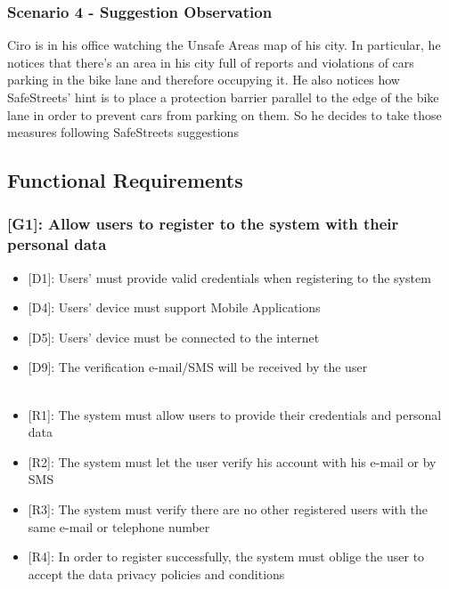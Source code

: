 \documentclass[12pt,a4paper]{article}
\begin{document}
\subsubsection*{Scenario 4 - Suggestion Observation}
Ciro is in his office watching the Unsafe Areas map of his city. In particular, he notices that there's an area in his city full of reports and violations of cars parking in the bike lane and therefore occupying it. He also notices how SafeStreets' hint is to place a protection barrier parallel to the edge of the bike lane in order to prevent cars from parking on them. So he decides to take those measures following SafeStreets suggestions
\newpage
\subsection{Functional Requirements}
\subsubsection*{{[}{G1}{]}: Allow users to register to the system with their personal data}
\begin{itemize}
\item {[D1]}: Users' must provide valid credentials when registering to the system
\item {[D4]}: Users' device must support Mobile Applications
\item {[D5]}: Users' device must be connected to the internet
\item {[D9]}: The verification e-mail/SMS will be received by the user 
\\\\
\item {[R1]}: The system must allow users to provide their credentials and personal data
\item {[R2]}: The system must let the user verify his account with his e-mail or by SMS
\item {[R3]}: The system must verify there are no other registered users with the same e-mail or telephone number
\item {[R4]}: In order to register successfully, the system must oblige the user to accept the data privacy policies and conditions
\end{itemize}
\end{document}
